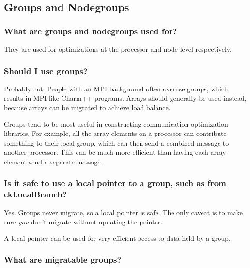 \subsection{\charmpp{} Groups and Nodegroups}

\subsubsection{What are groups and nodegroups used for?}

They are used for optimizations at the processor and node level respectively.

\subsubsection{Should I use groups?}

Probably not. People with an MPI background often overuse groups, which
results in MPI-like Charm++ programs. Arrays should generally be used
instead, because arrays can be migrated to achieve load balance.

Groups tend to be most useful in constructing communication optimization
libraries. For example, all the array elements on a processor can
contribute something to their local group, which can then send a combined
message to another processor. This can be much more efficient than
having each array element send a separate message.

\subsubsection{Is it safe to use a local pointer to a group, such as from ckLocalBranch?}

Yes. Groups never migrate, so a local pointer is safe. The only caveat
is to make sure {\em you} don't migrate without updating the pointer.

A local pointer can be used for very efficient access to data held by
a group.




\subsubsection{What are migratable groups?}

